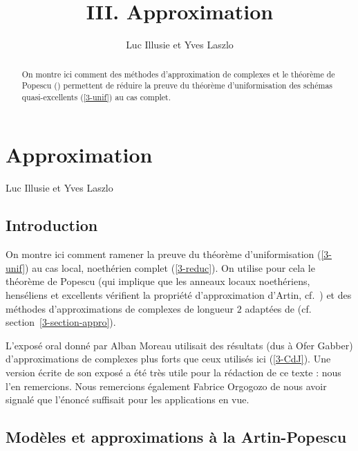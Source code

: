 \documentclass[10pt]{../fichiers-configuration-latex/smfart}
\begin{document}
\author{Luc Illusie et Yves Laszlo}


\title{III. Approximation}

\setcounter{tocdepth}{1}
\maketitle
\tableofcontents

\else
{}

\chapter{Approximation}
\begin{center}
Luc Illusie et Yves Laszlo
\end{center}
\fi

\begin{abstract}On montre ici comment des méthodes
d'approximation de complexes et le théorème de Popescu
() permettent de réduire la preuve
du théorème d'uniformisation des schémas quasi-excellents
(\ref{3-unif}) au cas complet.\end{abstract}



\section{Introduction} On montre ici comment ramener la preuve
du théorème d'uniformisation (\ref{3-unif}) au cas local,
noethérien complet (\ref{3-reduc}). On utilise pour cela
le théorème de Popescu (qui implique que les anneaux locaux
noethériens, henséliens et excellents vérifient la propriété
d'approximation d'Artin, cf.~) et des
méthodes d'approximations de complexes de longueur $2$ adaptées
de \cite{Con-deJ02} (cf. section~\ref{3-section-appro}).

L'exposé oral donné par Alban Moreau utilisait des résultats
(dus à Ofer Gabber) d'approximations de complexes plus forts
que ceux utilisés ici (\ref{3-CdJ}). Une version écrite de son
exposé a été très utile pour la rédaction de ce texte : nous
l'en remercions. Nous remercions également Fabrice Orgogozo de
nous avoir signalé que l'énoncé \cite[3.1]{Con-deJ02} suffisait
pour les applications en vue.

\section{Modèles et approximations à la Artin-Popescu}\label{3-mod}
\end{document}
